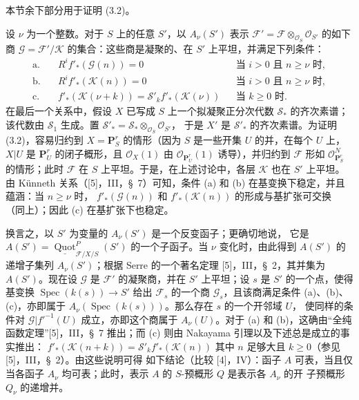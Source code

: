 本节余下部分用于证明 (3.2)。

设 $\nu$ 为一个整数。对于 $S$ 上的任意 $S'$，以 $A_\nu(S')$
表示 $\mathcal F'=\mathcal F\otimes_{\mathcal O_S}\mathcal O_{S'}$
的如下商
$\mathcal G=\mathcal F'/\mathcal K$ 的集合：这些商是凝聚的、在
$S'$ 上平坦，并满足下列条件：
\begin{align*}
\text{a.}\quad &R^if'_*(\mathcal G(n))=0 &&\text{当 $i>0$ 且 $n\geq\nu$ 时},\\
\text{b.}\quad &R^if'_*(\mathcal K(n))=0 &&\text{当 $i>0$ 且 $n\geq\nu$ 时},\\
\text{c.}\quad &f'_*(\mathcal K(\nu+k))
=\mathcal S'_k f'_*(\mathcal K(\nu)) &&\text{当 $k\geq0$ 时}.
\end{align*}
在最后一个关系中，假设 $X$ 已写成 $S$ 上一个拟凝聚正分次代数
$\mathcal S_*$ 的齐次素谱；该代数由 $\mathcal S_1$ 生成。置
$\mathcal S'_* =\mathcal S_*\otimes_{\mathcal O_S}\mathcal O_{S'}$，
于是 $X'$ 是 $\mathcal S'_*$ 的齐次素谱。为证明 (3.2)，容易归约到
$X=\mathbf P^r_S$ 的情形（因为 $S$ 是一些开集 $U$ 的并，在每个
$U$ 上，$X|U$ 是 $\mathbf P^r_U$ 的闭子概形，且
$\mathcal O_X(1)$ 由 $\mathcal O_{\mathbf P^r_U}(1)$ 诱导），并归约到
$\mathcal F$ 形如 $\mathcal O_{\mathbf P^r_S}^{N}$ 的情形；此时
$\mathcal F$ 在 $S$ 上平坦。于是，在上述讨论中，各层 $\mathcal K$
也在 $S'$ 上平坦。由 Künneth 关系（[5]，III，\S~7）可知，条件
(a) 和 (b) 在基变换下稳定，并且蕴涵：当 $n\geq\nu$ 时，
$f'_*(\mathcal G(n))$ 和 $f'_*(\mathcal K(n))$ 的形成与基扩张可交换
（同上）；因此 (c) 在基扩张下也稳定。

换言之，以 $S'$ 为变量的 $A_\nu(S')$ 是一个反变函子；更确切地说，
它是
$A(S')=\underline{\operatorname{Quot}}^P_{\mathcal F/X/S}(S')$
的一个子函子。当 $\nu$ 变化时，由此得到 $A(S')$ 的递增子集列
$A_\nu(S')$；根据 Serre 的一个著名定理 [5]，III，\S~2，其并集为
$A(S')$。现在设 $\mathcal G$ 是 $\mathcal F'$ 的凝聚商，并在 $S'$
上平坦；设 $s$ 是 $S'$ 的一个点，使得基变换
$\operatorname{Spec}(k(s))\longrightarrow S'$ 给出 $\mathcal F_s$
的一个商 $\mathcal G_s$，且该商满足条件 (a)、(b)、(c)，亦即属于
$A_\nu(\operatorname{Spec}(k(s)))$。那么存在 $s$ 的一个开邻域 $U$，
使同样的条件对 $\mathcal G|f'^{-1}(U)$ 成立，亦即这个商属于
$A_\nu(U)$。对于 (a) 和 (b)，这确由“全纯函数定理”[5]，III，\S~7
推出；而 (c) 则由 Nakayama 引理以及下述总是成立的事实推出：
$f'_*(\mathcal K(n+k))=\mathcal S'_k f'_*(\mathcal K(n))$
其中 $n$ 足够大且 $k\geq0$（参见 [5]，III，\S~2）。由这些说明可得
如下结论（比较 [4]，IV）：函子 $A$ 可表，当且仅当各函子 $A_\nu$
均可表；此时，表示 $A$ 的 $S$-预概形 $Q$ 是表示各 $A_\nu$ 的开
子预概形 $Q_\nu$ 的递增并。

